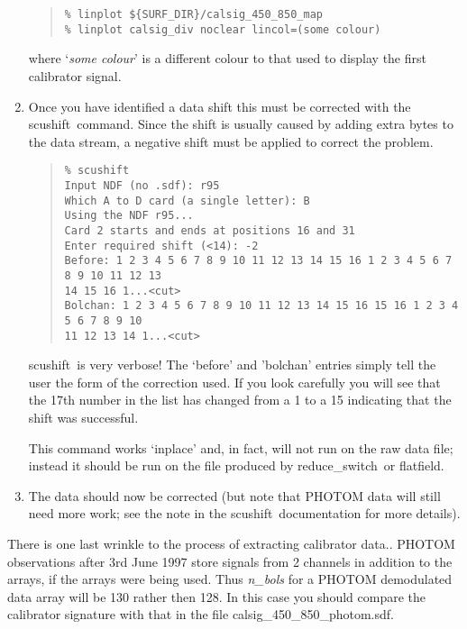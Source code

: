 \documentclass[twoside,11pt]{article}
\newcommand{\task}[1]{{\sf #1}}
\newcommand{\resw}{\htmlref{\task{reduce\_switch}}{REDUCE_SWITCH}}
\newcommand{\flatf}{\htmlref{\task{flatfield}}{FLATFIELD}}
\newcommand{\scushift}{\htmlref{\task{scushift}}{SCUSHIFT}}
\newenvironment{myquote}{\begin{quote}\begin{small}}{\end{small}\end{quote}}
\newcommand{\htmlref}[2]{#1}
\begin{document}
\begin{enumerate}
\begin{myquote}
\begin{verbatim}
% linplot ${SURF_DIR}/calsig_450_850_map
% linplot calsig_div noclear lincol=(some colour)
\end{verbatim}
\end{myquote}
where `\textit{some colour}' is a different colour to that used to display
the first calibrator signal.

\item Once you have identified a data shift this must be corrected with the
\scushift\ command. Since the shift is usually caused by adding extra bytes to 
the data stream, a negative shift must be applied to correct the problem.

\begin{myquote}
\begin{verbatim}
% scushift
Input NDF (no .sdf): r95
Which A to D card (a single letter): B
Using the NDF r95...
Card 2 starts and ends at positions 16 and 31
Enter required shift (<14): -2
Before: 1 2 3 4 5 6 7 8 9 10 11 12 13 14 15 16 1 2 3 4 5 6 7 8 9 10 11 12 13 
14 15 16 1...<cut>
Bolchan: 1 2 3 4 5 6 7 8 9 10 11 12 13 14 15 16 15 16 1 2 3 4 5 6 7 8 9 10 
11 12 13 14 1...<cut>
\end{verbatim}
\end{myquote}
\scushift\ is very verbose! The `before' and 'bolchan' entries simply tell the
user the form of the correction used. If you look carefully you will see
 that the 17th number in the list has changed from a 1 to a 15 indicating that 
the shift was successful.

This command works `inplace' and, in fact, will not run on the raw data file;
instead it should be run on the file produced by \resw\ or \flatf.

\item The data should now be corrected (but note that PHOTOM data will still
need more work; see the note in the \scushift\ documentation for more details).

\end{enumerate}


There is one last wrinkle to the process of extracting calibrator
data.. PHOTOM observations after 3rd June 1997 store signals from 2 channels
in addition to the arrays, if the arrays were being used.  Thus
\textit{n\_bols} for a PHOTOM demodulated data array will be 130 rather then
128. In this case you should compare the calibrator signature with that in the
file calsig\_450\_850\_photom.sdf.
\end{document}
